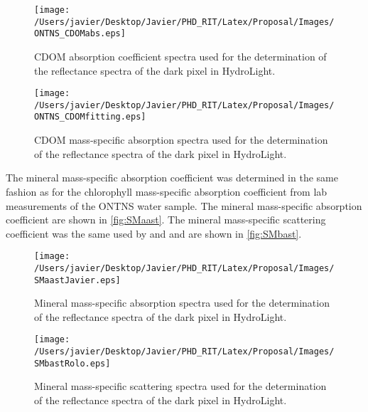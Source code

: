 \begin{figure}[htb]
  	\centering
  	\texttt{[image: /Users/javier/Desktop/Javier/PHD\_RIT/Latex/Proposal/Images/ONTNS\_CDOMabs.eps]}
  \caption{CDOM absorption coefficient spectra used for the determination of the reflectance spectra of the dark pixel in HydroLight. \label{fig:CDOMa} } 
\end{figure}

\begin{figure}[htb]
  	\centering
  	\texttt{[image: /Users/javier/Desktop/Javier/PHD\_RIT/Latex/Proposal/Images/ONTNS\_CDOMfitting.eps]}
  \caption{CDOM mass-specific absorption spectra used for the determination of the reflectance spectra of the dark pixel in HydroLight. \label{fig:CDOMaast} }
  \vspace{0.5cm} 
\end{figure}

The mineral mass-specific absorption coefficient was determined in the same fashion as for the chlorophyll mass-specific absorption coefficient from lab measurements of the ONTNS water sample. The mineral mass-specific absorption coefficient are shown in \autoref{fig:SMaast}. The mineral mass-specific scattering coefficient was the same used by \cite{Raqueno:2000} and \cite{Raqueno:2003} and are shown in \autoref{fig:SMbast}.

\begin{figure}[!ht]
  	\centering
  	\texttt{[image: /Users/javier/Desktop/Javier/PHD\_RIT/Latex/Proposal/Images/SMaastJavier.eps]}
  \caption{Mineral mass-specific absorption spectra used for the determination of the reflectance spectra of the dark pixel in HydroLight. \label{fig:SMaast} } 
  \vspace{0.5cm}
\end{figure}

\begin{figure}[!ht]
  	\centering
  	\texttt{[image: /Users/javier/Desktop/Javier/PHD\_RIT/Latex/Proposal/Images/SMbastRolo.eps]}
  \caption{Mineral mass-specific scattering spectra used for the determination of the reflectance spectra of the dark pixel in HydroLight. \label{fig:SMbast} } 
\end{figure}


